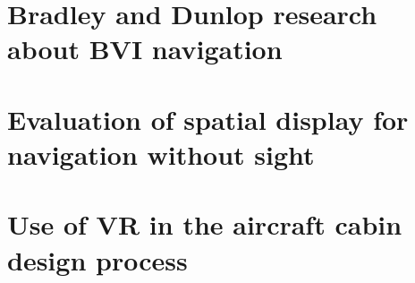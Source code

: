 \section{Bradley and Dunlop research about BVI navigation}
\label{sec:bradley_dunlop}


\section{Evaluation of spatial display for navigation without sight}
\label{sec:evaluation_spatial_display}


\section{Use of VR in the aircraft cabin design process}
\label{sec:vr_cabin}
